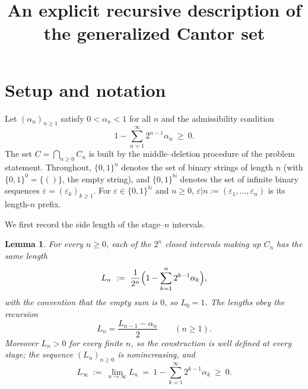 \documentclass{amsart}
\newtheorem{lemma}{Lemma}
\theoremstyle{definition}
\theoremstyle{remark}
\begin{document}
\title{An explicit recursive description of the generalized Cantor set}
\maketitle

\section{Setup and notation}

Let $(\alpha_n)_{n\ge1}$ satisfy $0<\alpha_n<1$ for all $n$ and the admissibility
condition
\begin{equation}\label{eq:adm}
1-\sum_{n=1}^{\infty}2^{n-1}\alpha_n\ \ge\ 0 .
\end{equation}
The set $C=\bigcap_{n\ge0}C_n$ is built by the middle--deletion procedure of the
problem statement. Throughout, $\{0,1\}^n$ denotes the set of binary strings of
length $n$ (with $\{0,1\}^0=\{()\}$, the empty string), and $\{0,1\}^{\mathbb N}$
denotes the set of infinite binary sequences $\varepsilon=(\varepsilon_k)_{k\ge1}$.
For $\varepsilon\in\{0,1\}^{\mathbb N}$ and $n\ge0$, $\varepsilon|n:=(\varepsilon_1,\dots,\varepsilon_n)$
is its length-$n$ prefix.

We first record the side length of the stage--$n$ intervals.

\begin{lemma}\label{lem:len}
For every $n\ge0$, each of the $2^{n}$ closed intervals making up $C_n$ has the
same length
\begin{equation}\label{eq:Ln}
L_n\ :=\ \frac{1}{2^{n}}\Bigl(1-\sum_{k=1}^{n}2^{k-1}\alpha_k\Bigr),
\end{equation}
with the convention that the empty sum is $0$, so $L_0=1$. The lengths obey the
recursion
\begin{equation}\label{eq:rec}
L_n=\frac{L_{n-1}-\alpha_n}{2}\qquad(n\ge1).
\end{equation}
Moreover $L_n>0$ for every finite $n$, so the construction is well defined at every
stage; the sequence $(L_n)_{n\ge0}$ is nonincreasing, and
\begin{equation}\label{eq:Linf}
L_\infty\ :=\ \lim_{n\to\infty}L_n\ =\ 1-\sum_{k=1}^{\infty}2^{k-1}\alpha_k\ \ge\ 0 .
\end{equation}
\end{lemma}
\end{document}
